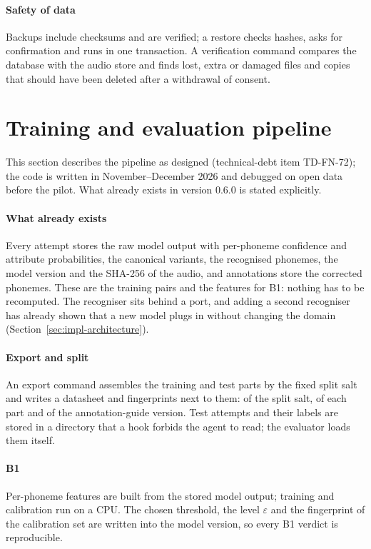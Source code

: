 \paragraph{Safety of data} Backups include checksums and are verified; a restore checks hashes, asks for
confirmation and runs in one transaction. A verification command compares the database with the audio store
and finds lost, extra or damaged files and copies that should have been deleted after a withdrawal of
consent.

\section{Training and evaluation pipeline}\label{sec:impl-training}

\begin{notebox}
This section describes the pipeline as designed (technical-debt item TD-FN-72); the code is written in
November--December 2026 and debugged on open data before the pilot. What already exists in version 0.6.0
is stated explicitly.
\end{notebox}

\paragraph{What already exists} Every attempt stores the raw model output with per-phoneme confidence and
attribute probabilities, the canonical variants, the recognised phonemes, the model version and the
SHA-256 of the audio, and annotations store the corrected phonemes. These are the training pairs and the
features for B1: nothing has to be recomputed. The recogniser sits behind a port, and adding a second
recogniser has already shown that a new model plugs in without changing the domain
(Section~\ref{sec:impl-architecture}).

\paragraph{Export and split} An export command assembles the training and test parts by the fixed split
salt and writes a datasheet \cite{SRC-123} and fingerprints next to them: of the split salt,
of each part and of the annotation-guide version. Test attempts and their labels are stored in a directory that a hook forbids
the agent to read; the evaluator loads them itself.

\paragraph{B1} Per-phoneme features are built from the stored model output; training and calibration run on
a CPU. The chosen threshold, the level $\varepsilon$ and the fingerprint of the calibration set are written
into the model version, so every B1 verdict is reproducible.

